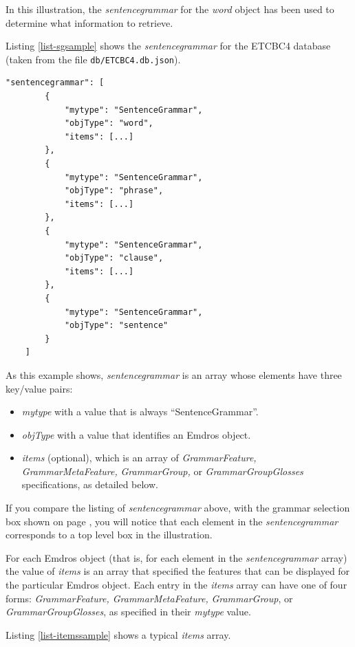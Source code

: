 \documentclass[11pt,oneside,a4paper]{memoir}
\begin{document}
In this illustration, the \emph{sentencegrammar} for the \emph{word} object
has been used to determine what information to retrieve.

Listing \ref{list-sgsample} shows the \emph{sentencegrammar} for the ETCBC4 database (taken from the
file \texttt{db/ETCBC4.db.json}).

\begin{lstlisting}[caption=Condensed sentencegrammar value,label=list-sgsample]
    "sentencegrammar": [
        {
            "mytype": "SentenceGrammar",
            "objType": "word",
            "items": [...]
        },
        {
            "mytype": "SentenceGrammar",
            "objType": "phrase",
            "items": [...]
        },
        {
            "mytype": "SentenceGrammar",
            "objType": "clause",
            "items": [...]
        },
        {
            "mytype": "SentenceGrammar",
            "objType": "sentence"
        }
    ]
\end{lstlisting}

As this example shows, \emph{sentencegrammar} is an array whose elements have
three key/value pairs:

\begin{itemize}
\item \emph{mytype} with a value that is always ``SentenceGrammar''.
\item \emph{objType} with a value that identifies an Emdros object.
\item \emph{items} (optional), which is an array of \emph{GrammarFeature,
  GrammarMetaFeature,} \emph{GrammarGroup,} or \emph{GrammarGroupGlosses} specifications, as detailed below.
\end{itemize}

If you compare the listing of \emph{sentencegrammar} above, with the grammar selection box shown on
page \pageref{grammarselect}, you will notice that each element in the \emph{sentencegrammar}
corresponds to a top level box in the illustration.

For each Emdros object (that is, for each element in the \emph{sentencegrammar} array) the value of
\emph{items} is an array that specified the features that can be displayed for the particular Emdros
object. Each entry in the \emph{items} array can have one of four forms: \emph{GrammarFeature,
  GrammarMetaFeature,} \emph{GrammarGroup}, or \emph{GrammarGroupGlosses}, as specified in their \emph{mytype} value.

Listing \ref{list-itemssample} shows a typical \emph{items} array.
\end{document}
